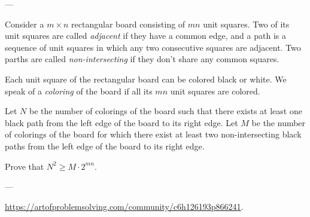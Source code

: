 
---

Consider a $m\times n$ rectangular board consisting of $mn$ unit squares. Two of its unit squares are called \emph{adjacent} if they have a common edge, and a path is a sequence of unit squares in which any two consecutive squares are adjacent. Two parths are called \emph{non-intersecting} if they don't share any common squares.

Each unit square of the rectangular board can be colored black or white. We speak of a \emph{coloring} of the board if all its $mn$ unit squares are colored.

Let $N$ be the number of colorings of the board such that there exists at least one black path from the left edge of the board to its right edge. Let $M$ be the number of colorings of the board for which there exist at least two non-intersecting black paths from the left edge of the board to its right edge.

Prove that $N^2\ge M\cdot2^{mn}$.

---

\url{https://artofproblemsolving.com/community/c6h126193p866241}.
